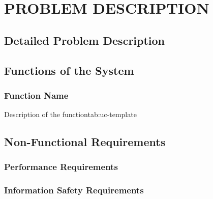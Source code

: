 \ThesisChapterNumbering
{}
\chapter{PROBLEM DESCRIPTION}\label{chap:problem}

\section{Detailed Problem Description}

\section{Functions of the System}
\subsection{Function Name}
\begin{usecasespec}{Description of the function}{tab:uc-template}
\end{usecasespec}

\section{Non-Functional Requirements}
\subsection{Performance Requirements}
\subsection{Information Safety Requirements}
